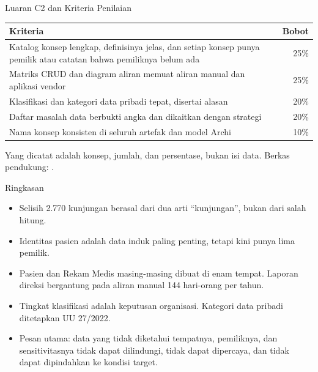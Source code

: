 \documentclass[aspectratio=169, table, 12pt]{beamer}
\begin{document}
\begin{frame}{{\Large Luaran C2 dan Kriteria Penilaian}}
  \footnotesize
  \begin{tabularx}{\textwidth}{Xr}
    \hline
    \textbf{Kriteria} & \textbf{Bobot} \\
    \hline
    Katalog konsep lengkap, definisinya jelas, dan setiap konsep punya pemilik
      atau catatan bahwa pemiliknya belum ada & 25\% \\
    \hline
    Matriks CRUD dan diagram aliran memuat aliran manual dan aplikasi vendor &
      25\% \\
    \hline
    Klasifikasi dan kategori data pribadi tepat, disertai alasan & 20\% \\
    \hline
    Daftar masalah data berbukti angka dan dikaitkan dengan strategi & 20\% \\
    \hline
    Nama konsep konsisten di seluruh artefak dan model Archi & 10\% \\
    \hline
  \end{tabularx}

  \vspace{6pt}
  \small Yang dicatat adalah konsep, jumlah, dan persentase, bukan isi data. Berkas pendukung:
  .
\end{frame}

\begin{frame}{{\Large Ringkasan}}
  \vspace{6pt}
  \small
  \begin{itemize}
    \item Selisih 2.770 kunjungan berasal dari dua arti ``kunjungan'', bukan dari salah hitung.
    \item Identitas pasien adalah data induk paling penting, tetapi kini punya lima pemilik.
    \item Pasien dan Rekam Medis masing-masing dibuat di enam tempat. Laporan direksi bergantung pada
          aliran manual 144 hari-orang per tahun.
    \item Tingkat klasifikasi adalah keputusan organisasi. Kategori data pribadi ditetapkan UU 27/2022.
    \item Pesan utama: data yang tidak diketahui tempatnya, pemiliknya, dan sensitivitasnya tidak dapat
          dilindungi, tidak dapat dipercaya, dan tidak dapat dipindahkan ke kondisi target.
  \end{itemize}
\end{frame}
\end{document}
